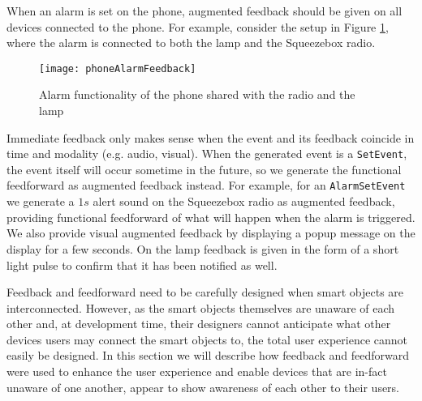 When an alarm is set on the phone, augmented feedback should be given on all devices connected to the phone. For example, consider the setup in Figure \ref{phoneAlarmFeedback}, where the alarm is connected to both the lamp and the Squeezebox radio. 

\begin{figure}
\centering
\texttt{[image: phoneAlarmFeedback]}
\caption{Alarm functionality of the phone shared with the radio and the lamp}
\label{phoneAlarmFeedback}
\end{figure}

Immediate feedback only makes sense when the event and its feedback coincide in time and modality (e.g. audio, visual). When the generated event is a \texttt{SetEvent}, the event itself will occur sometime in the future, so we generate the functional feedforward as augmented feedback instead. For example, for an \texttt{AlarmSetEvent} we generate a $1s$ alert sound on the Squeezebox radio as augmented feedback, providing functional feedforward of what will happen when the alarm is triggered. We also provide visual augmented feedback by displaying a popup message on the display for a few seconds. On the lamp feedback is given in the form of a short light pulse to confirm that it has been notified as well.

Feedback and feedforward need to be carefully designed when smart objects are interconnected. However, as the smart objects themselves are unaware of each other and, at development time, their designers cannot anticipate what other devices users may connect the smart objects to, the total user experience cannot easily be designed. In this section we will describe how feedback and feedforward were used to enhance the user experience and enable devices that are in-fact unaware of one another, appear to show awareness of each other to their users. 

